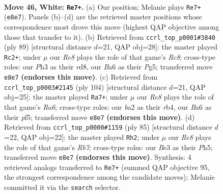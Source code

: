 \documentclass[11pt]{article}
\begin{document}
\clearpage

\begin{figure}[p]\centering
\begin{subfigure}{0.46\textwidth}\centering
\resizebox{\linewidth}{!}{%
\newchessgame
\chessboard[
  setfen={4R3/6k1/B2r4/8/4p2p/4Bp1P/b4P2/6K1 w - - 2 46},
  showmover=false,
  pgfstyle=straightmove, color=movearrow, markmove={e8-e7}
]}
\caption{}
\end{subfigure}\hfill
\begin{subfigure}{0.46\textwidth}\centering
\resizebox{\linewidth}{!}{%
\newchessgame
\chessboard[
  setfen={3R4/1B3pk1/4b3/2P3p1/7P/6P1/7K/2r5 b - - 0 45},
  showmover=false,
  pgfstyle=straightmove, color=movearrow, markmove={c1-c2}
]}
\caption{}
\end{subfigure}
\\[4pt]
\begin{subfigure}{0.46\textwidth}\centering
\resizebox{\linewidth}{!}{%
\newchessgame
\chessboard[
  setfen={8/4k1p1/R3b1Bp/5p1P/1r6/5P2/6PK/8 w - - 16 53},
  showmover=false,
  pgfstyle=straightmove, color=movearrow, markmove={a6-a7}
]}
\caption{}
\end{subfigure}\hfill
\begin{subfigure}{0.46\textwidth}\centering
\resizebox{\linewidth}{!}{%
\newchessgame
\chessboard[
  setfen={8/5k2/2R2bp1/7p/8/3KBPPP/1r6/8 b - - 10 43},
  showmover=false,
  pgfstyle=straightmove, color=movearrow, markmove={b2-h2}
]}
\caption{}
\end{subfigure}
\caption{\textbf{Move 46, White: \texttt{Re7+}.} (a) Our position; Melanie plays \texttt{Re7+} (\texttt{e8e7}). Panels (b)--(d) are the retrieved master positions whose correspondence most drove this move (highest QAP objective among those that transfer to it). (b) Retrieved from \texttt{ccrl\_top\_p0001\#3840} (ply 89) [structural distance $d$=21, QAP obj=28]: the master played \texttt{Rc2+}; under $\mu$ our \emph{Re8} plays the role of that game's \emph{Rc8}; cross-type roles: our \emph{P}h3 as their \emph{r}d8, our \emph{B}a6 as their \emph{P}g5; transferred move \texttt{e8e7} \textbf{(endorses this move)}. (c) Retrieved from \texttt{ccrl\_top\_p0003\#2145} (ply 104) [structural distance $d$=21, QAP obj=25]: the master played \texttt{Ra7+}; under $\mu$ our \emph{Re8} plays the role of that game's \emph{Ra6}; cross-type roles: our \emph{b}a2 as their \emph{r}b4, our \emph{B}a6 as their \emph{p}f5; transferred move \texttt{e8e7} \textbf{(endorses this move)}. (d) Retrieved from \texttt{ccrl\_top\_p0000\#1159} (ply 85) [structural distance $d$=22, QAP obj=22]: the master played \texttt{Rh2}; under $\mu$ our \emph{Re8} plays the role of that game's \emph{Rb7}; cross-type roles: our \emph{B}e3 as their \emph{P}h5; transferred move \texttt{e8e7} \textbf{(endorses this move)}. Synthesis: 4 retrieved analogs transferred to \texttt{Re7+} (summed QAP objective 95, the strongest correspondence among the candidate moves); Melanie committed it via the \texttt{search} selector.}
\label{fig:thought-m90}
\end{figure}
\end{document}
